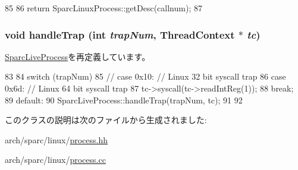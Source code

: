 \begin{DoxyCode}
85     {
86         return SparcLinuxProcess::getDesc(callnum);
87     }
\end{DoxyCode}
\hypertarget{classSparcISA_1_1Sparc64LinuxProcess_a7737d67ba76be0bd3beb0bd0dc93333a}{
\subsubsection[{handleTrap}]{\setlength{\rightskip}{0pt plus 5cm}void handleTrap (int {\em trapNum}, \/  {\bf ThreadContext} $\ast$ {\em tc})}}
\label{classSparcISA_1_1Sparc64LinuxProcess_a7737d67ba76be0bd3beb0bd0dc93333a}


\hyperlink{classSparcLiveProcess_a7737d67ba76be0bd3beb0bd0dc93333a}{SparcLiveProcess}を再定義しています。


\begin{DoxyCode}
83 {
84     switch (trapNum) {
85       // case 0x10: // Linux 32 bit syscall trap
86       case 0x6d: // Linux 64 bit syscall trap
87         tc->syscall(tc->readIntReg(1));
88         break;
89       default:
90         SparcLiveProcess::handleTrap(trapNum, tc);
91     }
92 }
\end{DoxyCode}


このクラスの説明は次のファイルから生成されました:\begin{DoxyCompactItemize}
\item 
arch/sparc/linux/\hyperlink{arch_2sparc_2linux_2process_8hh}{process.hh}\item 
arch/sparc/linux/\hyperlink{arch_2sparc_2linux_2process_8cc}{process.cc}\end{DoxyCompactItemize}
